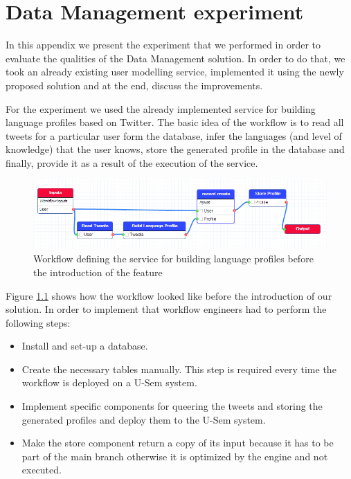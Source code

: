 \chapter{Data Management experiment} 
\label{cha:transf}

In this appendix we present the experiment that we performed in order to evaluate the qualities of the Data Management solution. In order to do that, we took an already existing user modelling service, implemented it using the newly proposed solution and at the end, discuss the improvements. 

For the experiment we used the already implemented service for building language profiles based on Twitter. The basic idea of the workflow is to read all tweets for a particular user form the database, infer the languages (and level of knowledge) that the user knows, store the generated profile in the database and finally, provide it as a result of the execution of the service.

\begin{figure}[h!]
  \centering
  	\includegraphics[scale=0.65]{storage/eval/before.png}
  \caption{Workflow defining the service for building language profiles before the introduction of the feature}
  \label{fig:storageEvalBefore}
\end{figure}

Figure \ref{fig:storageEvalBefore} shows how the workflow looked like before the introduction of our solution. In order to implement that workflow engineers had to perform the following steps:
\begin{itemize}
	\item Install and set-up a database.
	\item Create the necessary tables manually. This step is required every time the workflow is deployed on a U-Sem system. 
	\item Implement specific components for queering the tweets and storing the generated profiles and deploy them to the U-Sem system.
	\item Make the store component return a copy of its input because it has to be part of the main branch otherwise it is optimized by the engine and not executed.
\end{itemize}

